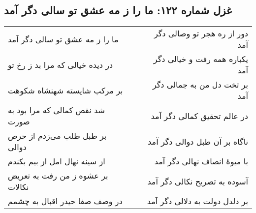 \begin{center}
\section*{غزل شماره ۱۲۲: ما را ز مه عشق تو سالی دگر آمد}
\label{sec:122}
\begin{longtable}{l p{0.5cm} r}
ما را ز مه عشق تو سالی دگر آمد
&&
دور از ره هجر تو وصالی دگر آمد
\\
در دیده خیالی که مرا بد ز رخ تو
&&
یکباره همه رفت و خیالی دگر آمد
\\
بر مرکب شایسته شهنشاه شکوهت
&&
بر تخت دل من به جمالی دگر آمد
\\
شد نقص کمالی که مرا بود به صورت
&&
در عالم تحقیق کمالی دگر آمد
\\
بر طبل طلب می‌زدم از حرص دوالی
&&
ناگاه بر آن طبل دوالی دگر آمد
\\
از سینه نهال امل از بیم بکندم
&&
با میوهٔ انصاف نهالی دگر آمد
\\
بر عشوه ز من رفت به تعریض نکالات
&&
آسوده به تصریح نکالی دگر آمد
\\
در وصف صفا حیدر اقبال به چشمم
&&
بر دلدل دولت به دلالی دگر آمد
\\
\end{longtable}
\end{center}
